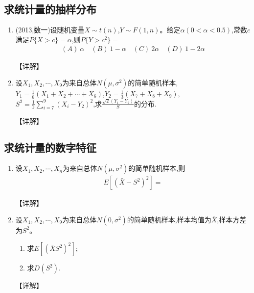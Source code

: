 \documentclass[12pt, a4paper, oneside, UTF8]{ctexbook}
\begin{document}
\subsection{求统计量的抽样分布}

\begin{enumerate}[label=\arabic*.]
    \item (2013,数一)设随机变量$X\sim t(n)$,$Y\sim F(1,n)$。给定$\alpha(0<\alpha<0.5)$,常数$c$满足$P\{X>c\}=\alpha$,则$P\{Y>c^2\}=$
    \begin{align*}
        (A)\ \alpha \quad (B)\ 1-\alpha \quad (C)\ 2\alpha \quad (D)\ 1-2\alpha
    \end{align*}
    
    \begin{solution}
    【详解】
    \end{solution}
    
    \item 设$X_1,X_2,\cdots,X_9$为来自总体$N(\mu,\sigma^2)$的简单随机样本,$Y_1=\frac{1}{6}(X_1+X_2+\cdots+X_6)$,$Y_2=\frac{1}{3}(X_7+X_8+X_9)$,$S^2=\frac{1}{2}\sum_{i=7}^9(X_i-Y_2)^2$,求$\frac{\sqrt{2}(Y_1-Y_2)}{S}$的分布.
    
    \begin{solution}
    【详解】
    \end{solution}
\end{enumerate}

\subsection{求统计量的数字特征}

\begin{enumerate}[label=\arabic*.,start=3]
    \item 设$X_1,X_2,\cdots,X_n$为来自总体$N(\mu,\sigma^2)$的简单随机样本,则
    \begin{align*}
        E\left[\left(\bar{X}-S^2\right)^2\right]=
    \end{align*}
    
    \begin{solution}
    【详解】
    \end{solution}
    
    \item 设$X_1,X_2,\cdots,X_9$为来自总体$N(0,\sigma^2)$的简单随机样本,样本均值为$\bar{X}$,样本方差为$S^2$。
    \begin{enumerate}
        \item 求$E[(\bar{X}S^2)^2]$;
        \item 求$D(S^2)$.
    \end{enumerate}
    
    \begin{solution}
    【详解】
    \end{solution}
\end{enumerate}
\end{document}
